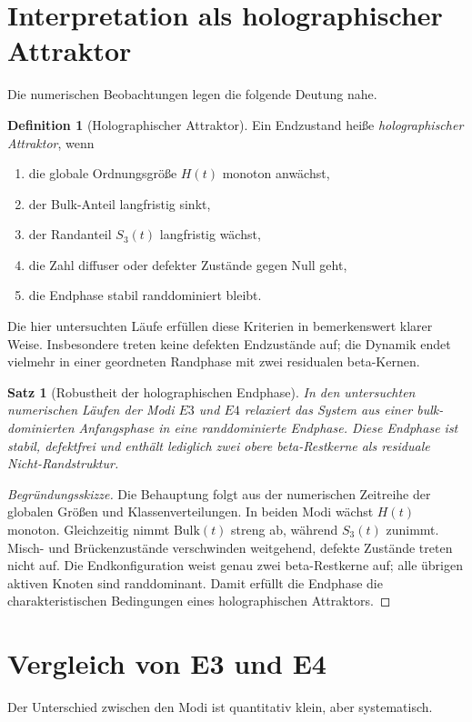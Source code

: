 \documentclass[11pt,a4paper]{article}
\newtheorem{satz}{Satz}
\theoremstyle{definition}
\newtheorem{definition}{Definition}
\theoremstyle{remark}
\begin{document}
	\section{Interpretation als holographischer Attraktor}
	Die numerischen Beobachtungen legen die folgende Deutung nahe.
	
	\begin{definition}[Holographischer Attraktor]
		Ein Endzustand heiße \emph{holographischer Attraktor}, wenn
		\begin{enumerate}[leftmargin=2em]
			\item die globale Ordnungsgröße $H(t)$ monoton anwächst,
			\item der Bulk-Anteil langfristig sinkt,
			\item der Randanteil $S_3(t)$ langfristig wächst,
			\item die Zahl diffuser oder defekter Zustände gegen Null geht,
			\item die Endphase stabil randdominiert bleibt.
		\end{enumerate}
	\end{definition}
	
	Die hier untersuchten Läufe erfüllen diese Kriterien in bemerkenswert klarer Weise. Insbesondere treten keine defekten Endzustände auf; die Dynamik endet vielmehr in einer geordneten Randphase mit zwei residualen beta-Kernen.
	
	\begin{satz}[Robustheit der holographischen Endphase]
		In den untersuchten numerischen Läufen der Modi $E3$ und $E4$ relaxiert das System aus einer bulk-dominierten Anfangsphase in eine randdominierte Endphase. Diese Endphase ist stabil, defektfrei und enthält lediglich zwei obere beta-Restkerne als residuale Nicht-Randstruktur.
	\end{satz}
	
	\begin{proof}[Begründungsskizze]
		Die Behauptung folgt aus der numerischen Zeitreihe der globalen Größen und Klassenverteilungen. In beiden Modi wächst $H(t)$ monoton. Gleichzeitig nimmt $\mathrm{Bulk}(t)$ streng ab, während $S_3(t)$ zunimmt. Misch- und Brückenzustände verschwinden weitgehend, defekte Zustände treten nicht auf. Die Endkonfiguration weist genau zwei beta-Restkerne auf; alle übrigen aktiven Knoten sind randdominant. Damit erfüllt die Endphase die charakteristischen Bedingungen eines holographischen Attraktors.
	\end{proof}
	
	\section{Vergleich von E3 und E4}
	Der Unterschied zwischen den Modi ist quantitativ klein, aber systematisch.
	
\end{document}
